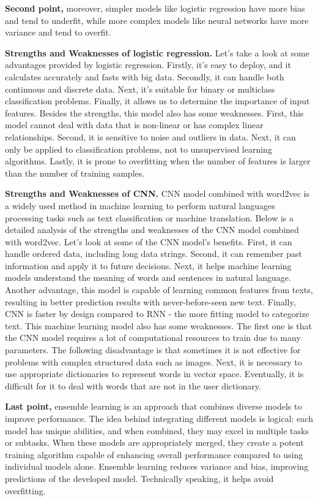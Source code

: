 \textbf{Second point,} moreover, simpler models like logistic regression have more bias and tend to underfit, while more complex models like neural networks have more variance and tend to overfit.

\textbf{Strengths and Weaknesses of logistic regression.} 
Let's take a look at some advantages provided by logistic regression. Firstly, it's easy to deploy, and it calculates accurately and fasts with big data. Secondly, it can handle both continuous and discrete data. Next, it's suitable for binary or multiclass classification problems. Finally, it allows us to determine the importance of input features. Besides the strengths, this model also has some weaknesses.
First, this model cannot deal with data that is non-linear or has complex linear relationships. Second, it is sensitive to noise and outliers in data. Next, it can only be applied to classification problems, not to unsupervised learning algorithms. Lastly, it is prone to overfitting when the number of features is larger than the number of training samples.

\textbf{Strengths and Weaknesses of CNN.} 
CNN model combined with word2vec is a widely used method in machine learning to perform natural languages processing tasks such as text classification or machine translation. Below is a detailed analysis of the strengths and weaknesses of the CNN model combined with word2vec.
Let's look at some of the CNN model's benefits. First, it can handle ordered data, including long data strings. Second, it can remember past information and apply it to future decisions. Next, it helps machine learning models understand the meaning of words and sentences in natural language. Another advantage, this model is capable of learning common features from texts, resulting in better prediction results with never-before-seen new text. Finally, CNN is faster by design compared to RNN - the more fitting model to categorize text. This machine learning model also has some weaknesses. The first one is that the CNN model requires a lot of computational resources to train due to many parameters. The following disadvantage is that sometimes it is not effective for problems with complex structured data such as images. Next, it is necessary to use appropriate dictionaries to represent words in vector space. Eventually, it is difficult for it to deal with words that are not in the user dictionary. 

\textbf{Last point,}
ensemble learning is an approach that combines diverse models to improve performance. The idea behind integrating different models is logical: each model has unique abilities, and when combined, they may excel in multiple tasks or subtasks. When these models are appropriately merged, they create a potent training algorithm capable of enhancing overall performance compared to using individual models alone.
Ensemble learning reduces variance and bias, improving predictions of the developed model. Technically speaking, it helps avoid overfitting.

